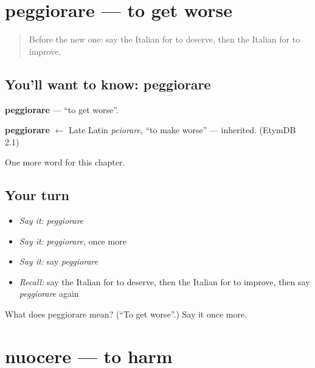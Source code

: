 \section[peggiorare]{peggiorare — to get worse}

\label{lesson:IT-C146-peggiorare}



\begin{quote}
Before the new one: say the Italian for to deserve, then the Italian for to improve.
\end{quote}

\subsection*{You'll want to know: peggiorare}
\textbf{peggiorare} — \textquotedblleft{}to get worse\textquotedblright{}.

\begin{cousinweb}
\textbf{peggiorare} $\leftarrow$ Late Latin \emph{peiorare}, \textquotedblleft{}to make worse\textquotedblright{} — inherited. (EtymDB 2.1)
\end{cousinweb}

\begin{grammarlens}[title={What you've built}]
One more word for this chapter.
\end{grammarlens}

\subsection*{Your turn}
\begin{itemize}
\raggedright
  \item \emph{Say it:} \emph{peggiorare}
  \item \emph{Say it:} \emph{peggiorare}, once more
  \item \emph{Say it:} say \emph{peggiorare}
  \item \emph{Recall:} say the Italian for to deserve, then the Italian for to improve, then say \emph{peggiorare} again
\end{itemize}

\begin{tcolorbox}[breakable,colback=teal!4,colframe=teal!35!black,title={Before you move on}]
What does peggiorare mean? (\textquotedblleft{}To get worse\textquotedblright{}.) Say it once more.
\end{tcolorbox}
\section[nuocere]{nuocere — to harm}

